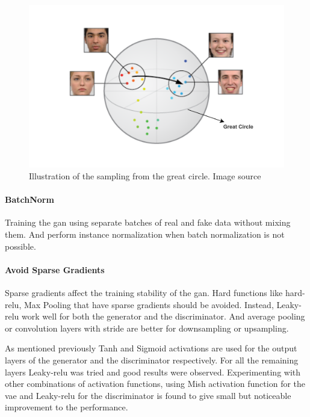 \begin{figure}[h] 
    \centering
    \includegraphics[width=\textwidth]{figures/background/sphericalZ.png}
    \caption{Illustration of the sampling from the great circle. Image source \cite{spherical_sampling}}
    \label{fig:great_circle}
\end{figure}

\paragraph{BatchNorm}
Training the \ac{gan} using separate batches of real and fake data without mixing them. And perform instance normalization when batch normalization is not possible.

\paragraph{Avoid Sparse Gradients}
Sparse gradients affect the training stability of the \ac{gan}. Hard functions like hard- \ac{relu}, Max Pooling that have sparse gradients should be avoided. Instead, Leaky-\ac{relu} work well for both the generator and the discriminator. And average pooling or convolution layers with stride are better for downsampling or upsampling.

As mentioned previously Tanh and Sigmoid activations are used for the output layers of the generator and the discriminator respectively. For all the remaining layers Leaky-\ac{relu} was tried and good results were observed. Experimenting with other combinations of activation functions, using Mish activation function \cite{mish} for the \ac{vae} and Leaky-\ac{relu} for the discriminator is found to give small but noticeable improvement to the performance.

